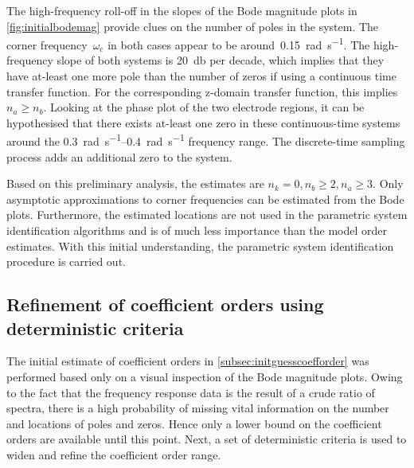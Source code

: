 The  high-frequency  roll-off  in  the   slopes  of  the  Bode  magnitude  plots
in  \cref{fig:initialbodemag}  provide clues  on  the  number  of poles  in  the
system.  The  corner frequency~$\omega_\text{c}$  in  both  cases appear  to  be
around~\SI{0.15}{\radian\per\second}. The  high-frequency slope of  both systems
is \approx\SI{20}{\decibel}  per decade, which  implies that they  have at-least
one more  pole than  the number  of zeros  if using  a continuous  time transfer
function. For  the corresponding z-domain  transfer function, this  implies $n_a
\ge n_b$. Looking at the phase plot of the two electrode regions, it can be
hypothesised that there exists at-least one zero in these  continuous-time
systems around the \SIrange{0.3}{0.4}{\radian\per\second} frequency range. The
discrete-time sampling process adds an additional zero to the system.


Based on this preliminary  analysis, the estimates are $n_k = 0,  n_b \ge 2, n_a
\ge 3$.  Only asymptotic approximations  to corner frequencies can  be estimated
from the  Bode plots. Furthermore, the  estimated locations are not  used in the
parametric system identification algorithms and  is of much less importance than
the  model order  estimates.  With this  initial  understanding, the  parametric
system identification procedure is carried out.

\subsection{Refinement of coefficient orders using deterministic criteria}\label{subsec:refinementofcoefforder}

The initial estimate  of coefficient orders in \cref{subsec:initguesscoefforder}
was performed  based only on  a visual inspection  of the Bode  magnitude plots.
Owing to  the fact that  the frequency  response data is  the result of  a crude
ratio of  spectra, there is a  high probability of missing  vital information on
the number and locations of poles and zeros. Hence only a lower bound on the
coefficient orders are available until this point. Next, a set of deterministic
criteria is used to widen and refine the coefficient order range.


